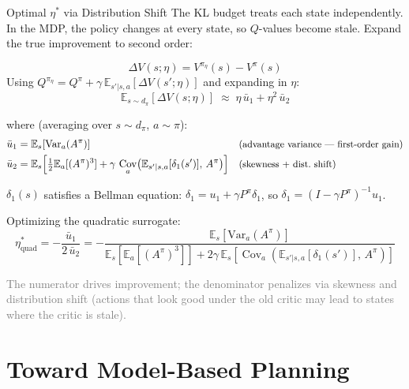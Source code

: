 \documentclass[aspectratio=169,11pt]{beamer}
\newcommand{\E}{\mathbb{E}}
\newcommand{\Var}{\mathrm{Var}}
\DeclareMathOperator{\Cov}{Cov}
\begin{document}
\begin{frame}{Optimal $\eta^*$ via Distribution Shift}
\small
The KL budget treats each state independently. In the MDP, the policy changes at every state, so $Q$-values become stale. Expand the true improvement to second order:

\pause
\vspace{-0.1cm}
\[
  \Delta V(s;\eta) = V^{\pi_\eta}(s) - V^\pi(s)
\]
Using $Q^{\pi_\eta} = Q^\pi + \gamma\,\E_{s'|s,a}[\Delta V(s';\eta)]$ and expanding in $\eta$:
\vspace{-0.1cm}
\[
  \E_{s\sim d_\pi}[\Delta V(s;\eta)] \;\approx\; \eta\, \bar{u}_1 + \eta^2\, \bar{u}_2
\]

\pause
\vspace{-0.1cm}
where (averaging over $s \sim d_\pi$, $a \sim \pi$):
\vspace{-0.1cm}
\begin{align*}
  \bar{u}_1 &= \E_s\!\left[\Var_a(A^\pi)\right] & &\text{\small (advantage variance --- first-order gain)}\\
  \bar{u}_2 &= \E_s\!\left[\tfrac{1}{2}\E_a[(A^\pi)^3] + \gamma\,\Cov_a\!\big(\E_{s'|s,a}[\delta_1(s')],\, A^\pi\big)\right] & &\text{\small (skewness + dist.\ shift)}
\end{align*}

\pause
\vspace{-0.1cm}
$\delta_1(s)$ satisfies a Bellman equation: $\delta_1 = u_1 + \gamma P^\pi \delta_1$, so $\delta_1 = (I - \gamma P^\pi)^{-1} u_1$.

\pause
\medskip
Optimizing the quadratic surrogate:
\[
  \boxed{\;\eta^*_{\text{quad}} = -\frac{\bar{u}_1}{2\,\bar{u}_2}
  = -\frac{
    \E_s[\Var_a(A^\pi)]
  }{
    \E_s[\E_a[(A^\pi)^3]]
    + 2\gamma\,\E_s[\Cov_a(\E_{s'|s,a}[\delta_1(s')],\, A^\pi)]
  }\;}
\]
\vspace{-0.2cm}

\small\textcolor{gray}{The numerator drives improvement; the denominator penalizes via skewness and distribution shift (actions that look good under the old critic may lead to states where the critic is stale).}
\end{frame}

\section{Toward Model-Based Planning}
\end{document}

